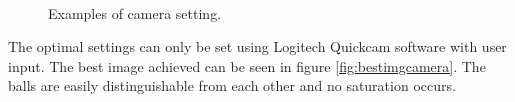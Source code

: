 \begin{figure}[htpb]
\centering
{}
\\

\caption{Examples of camera setting.}
\label{fig:wrongcamera}
\end{figure} 

The optimal settings can only be set using Logitech Quickcam software with user input. The best image achieved can be seen in figure \ref{fig:bestimgcamera}. The balls are easily distinguishable from each other and no saturation occurs.


